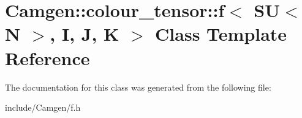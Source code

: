 \hypertarget{a00214}{\section{Camgen\-:\-:colour\-\_\-tensor\-:\-:f$<$ S\-U$<$ N $>$, I, J, K $>$ Class Template Reference}
\label{a00214}
}


The documentation for this class was generated from the following file\-:\begin{DoxyCompactItemize}
\item 
include/\-Camgen/f.\-h\end{DoxyCompactItemize}
